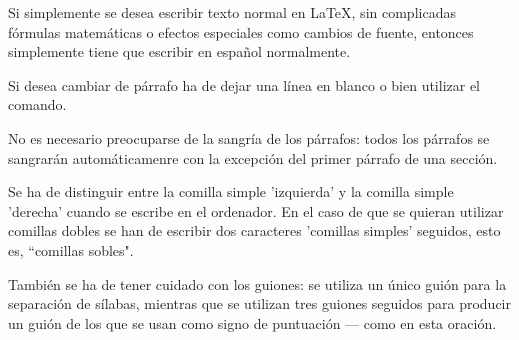 \documentclass[a4paper,10pt]{letter}
\begin{document}
Si simplemente se desea escribir texto normal en LaTeX, 
sin complicadas f\'ormulas matem\'aticas o efectos especiales
como cambios de fuente, entonces simplemente tiene que escribir
en espa\~nol normalmente.\par
Si desea cambiar de párrafo ha de dejar una línea en blanco o bien
utilizar el comando. \par
No es necesario preocuparse de la sangría de los párrafos:
todos los párrafos se sangrarán automáticamenre con la excepción
del primer párrafo de una sección.

Se ha de distinguir entre la comilla simple 'izquierda'
y la comilla simple 'derecha' cuando se escribe en el ordenador.
En el caso de que se quieran utilizar comillas dobles se han de
escribir dos caracteres 'comillas simples' seguidos, esto es,
``comillas sobles".

También se ha de tener cuidado con los guiones: se utiliza un único
guión para la separación de sílabas, mientras que se utilizan 
tres guiones seguidos para producir un guión de los que se usan 
como signo de puntuación --- como en esta oración.
\end{document}
